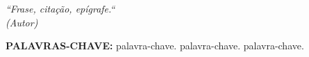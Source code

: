 \documentclass[
  12pt,		%
  a4paper,	%
  openright,%
  oneside,	%
  chapter=TITLE,		%
  section=TITLE,		%
  english,	%
  french,	%
  spanish,	%
  brazil
]{abntex2}
\begin{document}
    
    \begin{epigrafe}
        \vspace*{\fill}
    	\begin{flushright}
    		\textit{
        		``Frase, citação, epígrafe.``\\
        		(Autor)
    		}
    	\end{flushright}
    \end{epigrafe}
    
    
    \begin{resumo}
    
        \lipsum[1] %
        
        \vspace*{0.5cm}
    
        \noindent\textbf{\MakeUppercase{Palavras-Chave: }} palavra-chave. palavra-chave. palavra-chave.
    
    \end{resumo}
    
    
\end{document}
